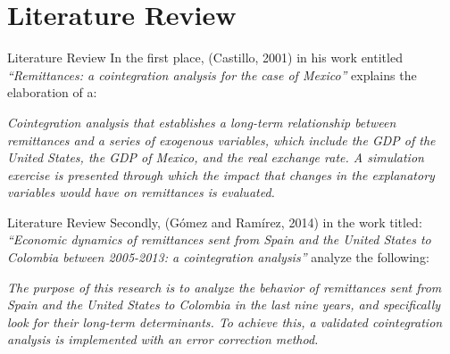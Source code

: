 \section{Literature Review}
    \begin{frame}{Literature Review}
In the first place, (Castillo, 2001) in his work entitled \textit{“Remittances: a cointegration analysis for the case of Mexico”} explains the elaboration of a:\par
\textit{Cointegration analysis that establishes a long-term relationship between remittances and a series of exogenous variables, which include the GDP of the United States, the GDP of Mexico, and the real exchange rate. A simulation exercise is presented through which the impact that changes in the explanatory variables would have on remittances is evaluated.}\par
\end{frame}
\begin{frame}{Literature Review}
Secondly, (Gómez and Ramírez, 2014) in the work titled: \textit{“Economic dynamics of remittances sent from Spain and the United States to Colombia between 2005-2013: a cointegration analysis”} analyze the following:\par
\textit{The purpose of this research is to analyze the behavior of remittances sent from Spain and the United States to Colombia in the last nine years, and specifically look for their long-term determinants. To achieve this, a validated cointegration analysis is implemented with an error correction method.}\par
\end{frame}

